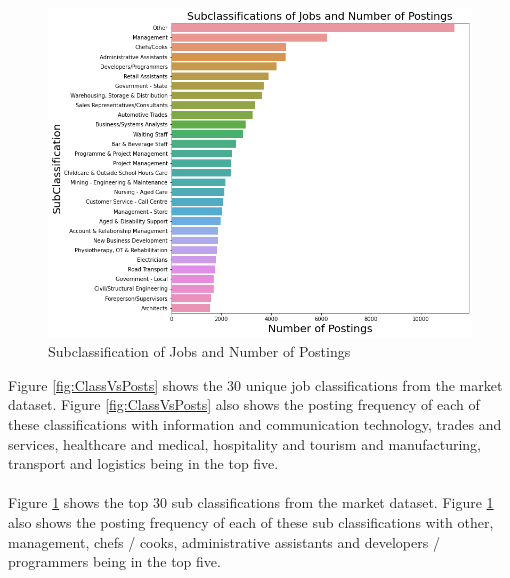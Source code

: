 \documentclass[twoside, 12pt, a4paper]{article}
\begin{document}
\begin{figure}[h!]
	\centering
	\includegraphics[scale = 0.45]{SubClassVsPostings.png}
	\caption{Subclassification of Jobs and Number of Postings}
	\label{fig:SubClassVsPosts}
\end{figure}

\newpage 
Figure \ref{fig:ClassVsPosts} shows the 30 unique job classifications from the market dataset. Figure \ref{fig:ClassVsPosts} also shows the posting frequency of each of these classifications with information and communication technology, trades and services, healthcare and medical, hospitality and tourism and manufacturing, transport and logistics being in the top five.\\\\
Figure \ref{fig:SubClassVsPosts} shows the top 30 sub classifications from the market dataset. Figure \ref{fig:SubClassVsPosts} also shows the posting frequency of each of these sub classifications with other, management, chefs / cooks, administrative assistants and developers / programmers being in the top five. 
\end{document}
